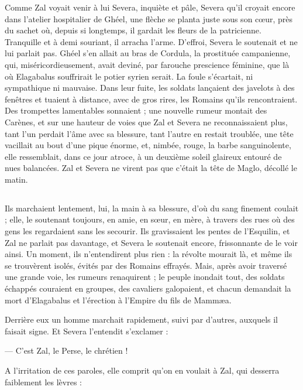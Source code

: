 \documentclass[a4paper, 11pt, oneside, polutonikogreek, french]{article}
\begin{document}
Comme Zal voyait venir à lui Severa, inquiète et pâle, Severa qu'il croyait encore dans l'atelier hospitalier de Ghéel, une flèche se planta juste sous son cœur, près du sachet où, depuis si longtemps, il gardait les fleurs de la patricienne. Tranquille et à demi souriant, il arracha l'arme. D'effroi, Severa le soutenait et ne lui parlait pas. Ghéel s'en allait au bras de Cordula, la prostituée campanienne, qui, miséricordieusement, avait deviné, par farouche prescience féminine, que là où Elagabalus souffrirait le potier syrien serait. La foule s'écartait, ni sympathique ni mauvaise. Dans leur fuite, les soldats lançaient des javelots à des fenêtres et tuaient à distance, avec de gros rires, les Romains qu'ils rencontraient. Des trompettes lamentables sonnaient ; une nouvelle rumeur montait des Carènes, et sur une hauteur de voies que Zal et Severa ne reconnaissaient plus, tant l'un perdait l'âme avec sa blessure, tant l'autre en restait troublée, une tête vacillait au bout d'une pique énorme, et, nimbée, rouge, la barbe sanguinolente, elle ressemblait, dans ce jour atroce, à un deuxième soleil glaireux entouré de nues balancées. Zal et Severa ne virent pas que c'était la tête de Maglo, décollé le matin.
\clearpage
\subsection{}
\paragraph{}
Ils marchaient lentement, lui, la main à sa blessure, d'où du sang finement coulait ; elle, le soutenant toujours, en amie, en sœur, en mère, à travers des rues où des gens les regardaient sans les secourir. Ils gravissaient les pentes de l'Esquilin, et Zal ne parlait pas davantage, et Severa le soutenait encore, frissonnante de le voir ainsi. Un moment, ils n'entendirent plus rien : la révolte mourait là, et même ils se trouvèrent isolés, évités par des Romains effrayés. Mais, après avoir traversé une grande voie, les rumeurs renaquirent ; le peuple inondait tout, des soldats échappés couraient en groupes, des cavaliers galopaient, et chacun demandait la mort d'Elagabalus et l'érection à l'Empire du fils de Mammæa.

Derrière eux un homme marchait rapidement, suivi par d'autres, auxquels il faisait signe. Et Severa l'entendit s'exclamer :

--- C'est Zal, le Perse, le chrétien !

A l'irritation de ces paroles, elle comprit qu'on en voulait à Zal, qui desserra faiblement les lèvres :
\end{document}
